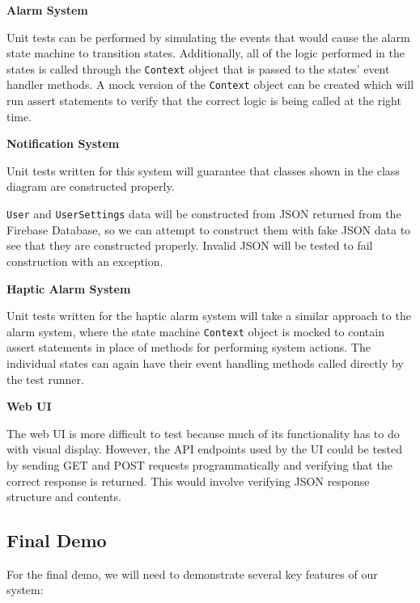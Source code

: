 \textbf{Alarm System}

Unit tests can be performed by simulating the events that would cause the alarm state machine to transition states.
Additionally, all of the logic performed in the states is called through the \texttt{Context} object that is passed to
the states' event handler methods. A mock version of the \texttt{Context} object can be created which will run assert
statements to verify that the correct logic is being called at the right time.

\textbf{Notification System}

Unit tests written for this system will guarantee that classes shown in the class diagram are constructed properly.

\texttt{User} and \texttt{UserSettings} data will be constructed from JSON returned from the Firebase Database, so we
can attempt to construct them with fake JSON data to see that they are constructed properly. Invalid JSON will be tested
to fail construction with an exception.

\textbf{Haptic Alarm System}

Unit tests written for the haptic alarm system will take a similar approach to the alarm system, where the state
machine \texttt{Context} object is mocked to contain assert statements in place of methods for performing system
actions. The individual states can again have their event handling methods called directly by the test runner.

\textbf{Web UI}

The web UI is more difficult to test because much of its functionality has to do with visual display. However, the API
endpoints used by the UI could be tested by sending GET and POST requests programmatically and verifying that the
correct response is returned. This would involve verifying JSON response structure and contents.

\subsection{Final Demo}

For the final demo, we will need to demonstrate several key features of our system:

